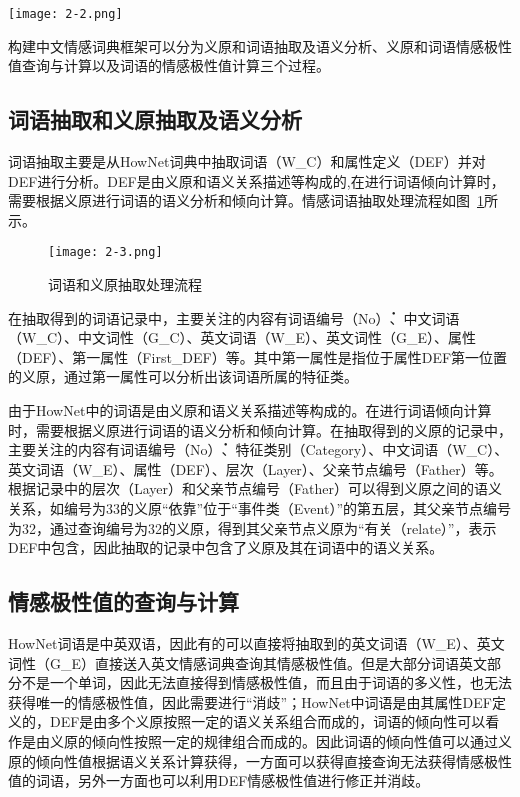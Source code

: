 \begin{landscape}
\begin{figure*}
\centering
\texttt{[image: 2-2.png]}
\caption{基于语义关系的情感词典解决方案}
\label{frame}
\end{figure*}
\end{landscape}
构建中文情感词典框架可以分为义原和词语抽取及语义分析、义原和词语情感极性值查询与计算以及词语的情感极性值计算三个过程。

\subsection{词语抽取和义原抽取及语义分析}
词语抽取主要是从HowNet词典中抽取词语（W\_C）和属性定义（DEF）并对DEF进行分析。DEF是由义原和语义关系描述等构成的,在进行词语倾向计算时，需要根据义原进行词语的语义分析和倾向计算。情感词语抽取处理流程如图~\ref{atom}所示。

\begin{figure}[htp]
\centering
\texttt{[image: 2-3.png]}
\caption{词语和义原抽取处理流程}
\label{atom}
\end{figure}

在抽取得到的词语记录中，主要关注的内容有词语编号（No\.）、中文词语（W\_C）、中文词性（G\_C）、英文词语（W\_E）、英文词性（G\_E）、属性（DEF）、第一属性（First\_DEF）等。其中第一属性是指位于属性DEF第一位置的义原，通过第一属性可以分析出该词语所属的特征类。

由于HowNet中的词语是由义原和语义关系描述等构成的。在进行词语倾向计算时，需要根据义原进行词语的语义分析和倾向计算。在抽取得到的义原的记录中，主要关注的内容有词语编号（No\.）、特征类别（Category）、中文词语（W\_C）、英文词语（W\_E）、属性（DEF）、层次（Layer）、父亲节点编号（Father）等。根据记录中的层次（Layer）和父亲节点编号（Father）可以得到义原之间的语义关系，如编号为33的义原“依靠”位于“事件类（Event）”的第五层，其父亲节点编号为32，通过查询编号为32的义原，得到其父亲节点义原为“有关（relate）”，表示DEF中包含，因此抽取的记录中包含了义原及其在词语中的语义关系。

\subsection{情感极性值的查询与计算}
HowNet词语是中英双语，因此有的可以直接将抽取到的英文词语（W\_E）、英文词性（G\_E）直接送入英文情感词典查询其情感极性值。但是大部分词语英文部分不是一个单词，因此无法直接得到情感极性值，而且由于词语的多义性，也无法获得唯一的情感极性值，因此需要进行“消歧”；HowNet中词语是由其属性DEF定义的，DEF是由多个义原按照一定的语义关系组合而成的，词语的倾向性可以看作是由义原的倾向性按照一定的规律组合而成的。因此词语的倾向性值可以通过义原的倾向性值根据语义关系计算获得，一方面可以获得直接查询无法获得情感极性值的词语，另外一方面也可以利用DEF情感极性值进行修正并消歧。

